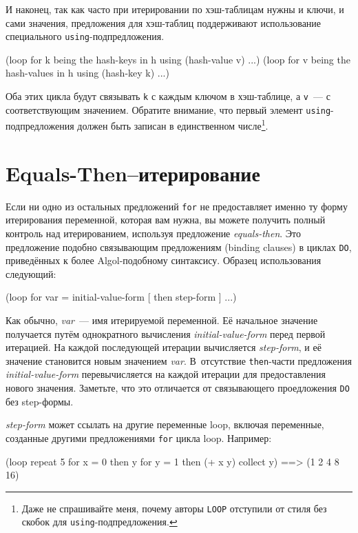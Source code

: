 И наконец, так как часто при итерировании по хэш-таблицам нужны и ключи, и сами значения,
предложения для хэш-таблиц поддерживают использование специального
\lstinline{using}-подпредложения.

\begin{myverb}
(loop for k being the hash-keys in h using (hash-value v) ...)
(loop for v being the hash-values in h using (hash-key k) ...)
\end{myverb}

Оба этих цикла будут связывать \lstinline{k} с каждым ключом в хэш-таблице, а \lstinline{v}~--- с
соответствующим значением. Обратите внимание, что первый элемент
\lstinline{using}-подпредложения должен быть записан в единственном числе\footnote{Даже не
    спрашивайте меня, почему авторы \lstinline{LOOP} отступили от стиля без скобок для
    \lstinline{using}-подпредложения.}.

\section{Equals-Then--итерирование}

Если ни одно из остальных предложений \lstinline{for} не предоставляет именно ту форму
итерирования переменной, которая вам нужна, вы можете получить полный контроль над
итерированием, используя предложение \textit{equals-then}. Это предложение подобно
связывающим предложениям (binding clauses) в циклах \lstinline{DO}, приведённых к более
Algol-подобному синтаксису. Образец использования следующий:

\begin{myverb}
(loop for var = initial-value-form [ then step-form ] ...)
\end{myverb}

Как обычно, \textit{var}~--- имя итерируемой переменной. Её начальное значение получается
путём однократного вычисления \textit{initial-value-form} перед первой итерацией. На
каждой последующей итерации вычисляется \textit{step-form}, и её значение становится новым
значением \textit{var}. В~отсутствие \lstinline{then}-части предложения
\textit{initial-value-form} перевычисляется на каждой итерации для предоставления нового
значения. Заметьте, что это отличается от связывающего проедложения \lstinline{DO} без
step-формы.

\textit{step-form} может ссылать на другие переменные loop, включая переменные, созданные
другими предложениями \lstinline{for} цикла loop. Например:

\begin{myverb}
(loop repeat 5 
      for x = 0 then y
      for y = 1 then (+ x y)
      collect y) ==> (1 2 4 8 16)
\end{myverb}

